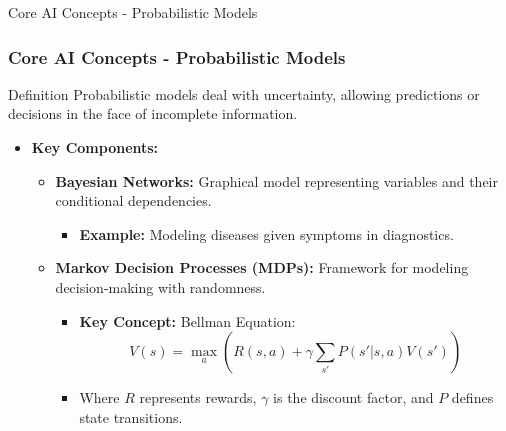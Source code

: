 \documentclass[aspectratio=169]{beamer}
\begin{document}
\begin{frame}[fragile]{Core AI Concepts - Probabilistic Models}
    \frametitle{Core AI Concepts - Probabilistic Models}
    \begin{block}{Definition}
        Probabilistic models deal with uncertainty, allowing predictions or decisions in the face of incomplete information.
    \end{block}

    \begin{itemize}
        \item \textbf{Key Components:}
        \begin{itemize}
            \item \textbf{Bayesian Networks:} Graphical model representing variables and their conditional dependencies.
                \begin{itemize}
                    \item \textbf{Example:} Modeling diseases given symptoms in diagnostics.
                \end{itemize}
            \item \textbf{Markov Decision Processes (MDPs):} Framework for modeling decision-making with randomness.
                \begin{itemize}
                    \item \textbf{Key Concept:} Bellman Equation: 
                    \begin{equation}
                        V(s) = \max_a \left( R(s, a) + \gamma \sum_{s'} P(s'|s, a)V(s') \right)
                    \end{equation}
                    \item Where \( R \) represents rewards, \( \gamma \) is the discount factor, and \( P \) defines state transitions.
                \end{itemize}
        \end{itemize}
    \end{itemize}
\end{frame}
\end{document}
